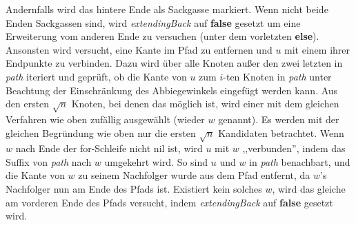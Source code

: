 \documentclass[a4paper, 10pt, ngerman]{article}
\begin{document}
Andernfalls wird das hintere Ende als Sackgasse markiert. Wenn nicht beide Enden Sackgassen sind, wird \emph{extendingBack} auf \textbf{false} gesetzt um eine Erweiterung vom anderen Ende zu versuchen (unter dem vorletzten \textbf{else}). Ansonsten wird versucht, eine Kante im Pfad zu entfernen und $u$ mit einem ihrer Endpunkte zu verbinden. Dazu wird über alle Knoten außer den zwei letzten in \emph{path} iteriert und geprüft, ob die Kante von $u$ zum $i$-ten Knoten in \emph{path} unter Beachtung der Einschränkung des Abbiegewinkels eingefügt werden kann. Aus den ersten $\sqrt n$ Knoten, bei denen das möglich ist, wird einer mit dem gleichen Verfahren wie oben zufällig ausgewählt (wieder $w$ genannt). Es werden mit der gleichen Begründung wie oben nur die ersten $\sqrt n$ Kandidaten betrachtet. Wenn $w$ nach Ende der for-Schleife nicht nil ist, wird $u$ mit $w$ ,,verbunden'', indem das Suffix von \emph{path} nach $w$ umgekehrt wird. So sind $u$ und $w$ in \emph{path} benachbart, und die Kante von $w$ zu seinem Nachfolger wurde aus dem Pfad entfernt, da $w$'s Nachfolger nun am Ende des Pfads ist. Existiert kein solches $w$, wird das gleiche am vorderen Ende des Pfads versucht, indem \emph{extendingBack} auf \textbf{false} gesetzt wird.
\end{document}
